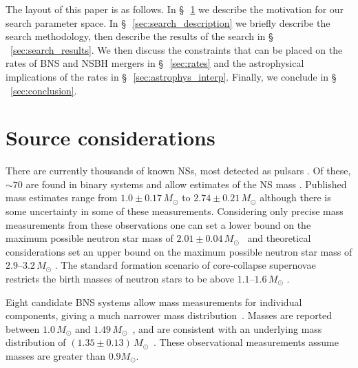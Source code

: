 \documentclass[twocolumn]{aastex6}
\begin{document}
The layout of this paper is as follows. In \S\,~\ref{sec:source_considerations} we describe
the motivation for our search parameter space. In \S\,~\ref{sec:search_description} we briefly
describe the search methodology, then describe the results of the search in \S\,~\ref{sec:search_results}.
We then discuss the constraints that can be placed on the rates of \ac{BNS} and \ac{NSBH} mergers in \S\,~\ref{sec:rates}
and the astrophysical implications of the rates in \S\,~\ref{sec:astrophys_interp}. Finally, we conclude
in \S\,~\ref{sec:conclusion}.

\section{Source considerations}
\label{sec:source_considerations}

There are currently thousands of known NSs, most detected as pulsars
\citep{pulsarcat,Manchester:2004bp}. Of these, $\sim70$ are found in binary
systems and allow estimates of the NS mass
\citep{nsmassespage,Lattimer:2012nd,Ozel:2016oaf}.
Published mass estimates range from $1.0\pm0.17\,{M_{\odot}}$ \citep{Falanga:2015mra} to
$2.74\pm0.21\,{{M_{\odot}}}$ \citep{Freire:2007jd} although there is some uncertainty
in some of these measurements.
Considering only precise mass measurements from these observations one can set a lower bound
on the maximum possible neutron star mass of $2.01\pm 0.04\,{M_{\odot}}$~\citep{Antoniadis:2013pzd} and theoretical considerations
set an upper bound on the maximum possible neutron star mass of $2.9$--$3.2\,{M_{\odot}}$ \citep{Rhoades:1974fn,Kalogera:1996ci}.
The standard formation scenario of core-collapse supernovae restricts the birth
masses of neutron stars to be above $1.1$--$1.6\,{M_{\odot}}$
\citep{Ozel:2012ax,Lattimer:2012nd,Kiziltan:2013oja}.

Eight candidate \ac{BNS} systems allow mass measurements for individual
components, giving a much narrower mass distribution~\citep{Lorimer:2008se}. Masses are
reported between $1.0\,{{M_{\odot}}}$ and 
$1.49\,{{M_{\odot}}}$~\citep{nsmassespage,Ozel:2016oaf}, and are consistent with an
underlying mass distribution of $(1.35 \pm
0.13)\,{{M_{\odot}}}$~\citep{Kiziltan:2010ct}. 
These observational measurements assume masses are greater than $0.9{{M_{\odot}}}$. 
\end{document}
